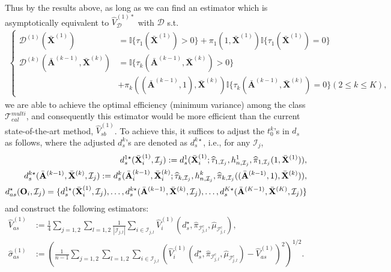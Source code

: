 \documentclass[11pt]{article}
\theoremstyle{referenceplain}
\theoremstyle{referencedefinition}
\theoremstyle{referenceremark}
\begin{document}
Thus by the results above, as long as we can find an estimator which is asymptotically equivalent to $\widehat{V}_{\mathcal{D}}^{(1)*}$ with $\mathcal{D}$ s.t.
\begin{align*}
    \left\{ \begin{array}{ll}
 \mathcal{D}^{(1)}(\bar{\mathbf{X}}^{(1)})&=\mathbb{I}\{\tau_1(\bar{\mathbf{X}}^{(1)})>0\}+\pi_1(1,\bar{\mathbf{X}}^{(1)})\mathbb{I}\{\tau_1(\bar{\mathbf{X}}^{(1)})=0\}\\
  \mathcal{D}^{(k)}(\bar{\mathbf{A}}^{(k-1)},\bar{\mathbf{X}}^{(k)})&=\mathbb{I}\{\tau_k(\bar{\mathbf{A}}^{(k-1)},\bar{\mathbf{X}}^{(k)})>0\}\\
  &+\pi_k((\bar{\mathbf{A}}^{(k-1)},1),\bar{\mathbf{X}}^{(k)})\mathbb{I}\{\tau_k(\bar{\mathbf{A}}^{(k-1)},\bar{\mathbf{X}}^{(k)})=0\} (2\leq k\leq K),
\end{array} \right. 
\end{align*}
we are able to achieve the optimal efficiency (minimum variance) among the class $\mathcal{T}_{eal}^{multi}$, and consequently this estimator would be more efficient than the current state-of-the-art method, $\widehat{V}_{sb}^{(1)}$. To achieve this, it suffices to adjust the $t_0^k$'s in $d_{s}$ as follows, where the adjusted $d_{s}^k$'s are denoted as $d_{s}^{k\star}$, i.e., for any $\mathcal{I}_j$,
    \begin{align*}
        d_{s}^{1\star}(\bar{\mathbf{X}}_i^{(1)},\mathcal{I}_{j}):=d_{s}^1(\bar{\mathbf{X}}_i^{(1)};\widehat{\tau}_{1,\mathcal{I}_{j}},h_{n,\mathcal{I}_{j}}^1, \widehat{\pi}_{1,\mathcal{I}_{j}}(1,\bar{\mathbf{X}}^{(1)})),\\
       d_{s}^{k\star}(\bar{\mathbf{A}}^{(k-1)},\bar{\mathbf{X}}^{(k)},\mathcal{I}_{j}):=d_{s}^k(\Bar{\mathbf{A}}_{i}^{(k-1)},\bar{\mathbf{X}}_i^{(k)};\widehat{\tau}_{k,\mathcal{I}_{j}},h_{n,\mathcal{I}_{j}}^k,\widehat{\pi}_{k,\mathcal{I}_{j}}((\bar{\mathbf{A}}^{(k-1)},1),\bar{\mathbf{X}}^{(k)})),\\
       d_{as}^{\star}(\mathbf{O}_i,\mathcal{I}_{j})=\{ d_{s}^{1\star}(\bar{\mathbf{X}}_i^{(1)},\mathcal{I}_{j}),\dots, d_{s}^{k\star}(\bar{\mathbf{A}}^{(k-1)},\bar{\mathbf{X}}^{(k)},\mathcal{I}_{j}),\dots, d_{s}^{K\star}(\bar{\mathbf{A}}^{(K-1)},\bar{\mathbf{X}}^{(K)},\mathcal{I}_{j})\}
    \end{align*}
    and construct the following estimators:
    \begin{align*}
            \widehat{V}_{as}^{(1)}&:= \frac{1}{4}\sum_{j=1,2}\sum_{l=1,2}\frac{1}{|\mathcal{I}_{j,l}|}\sum_{i\in\mathcal{I}_{j,l}}\widehat{V}_i^{(1)}(d_{s}^{\star},\widehat{\pi}_{\mathcal{I}_{j,l}^c},\widehat{\mu}_{\mathcal{I}_{j,l}^c}),\\
    \widehat{\sigma}_{as}^{(1)}&:=\left(\frac{1}{n-1}\sum_{j=1,2}\sum_{l=1,2}\sum_{i\in\mathcal{I}_{j,l}}\left(\widehat{V}_i^{(1)}(d_{s}^{\star},\widehat{\pi}_{\mathcal{I}_{j,l}^c},\widehat{\mu}_{\mathcal{I}_{j,l}^c})-  \widehat{V}_{as}^{(1)}\right)^2\right)^{1/2}.
    \end{align*}
\end{document}

